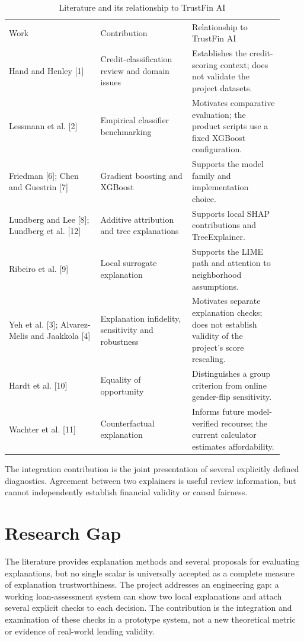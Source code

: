 \documentclass[12pt,a4paper]{report}
\begin{document}
\begin{longtable}{p{0.307\linewidth}p{0.307\linewidth}p{0.307\linewidth}}
\caption{Literature and its relationship to TrustFin AI}\\

Work & Contribution & Relationship to TrustFin AI\\
Hand and Henley [1] & Credit-classification review and domain issues & Establishes the credit-scoring context; does not validate the project datasets.\\
Lessmann et al. [2] & Empirical classifier benchmarking & Motivates comparative evaluation; the product scripts use a fixed XGBoost configuration.\\
Friedman [6]; Chen and Guestrin [7] & Gradient boosting and XGBoost & Supports the model family and implementation choice.\\
Lundberg and Lee [8]; Lundberg et al. [12] & Additive attribution and tree explanations & Supports local SHAP contributions and TreeExplainer.\\
Ribeiro et al. [9] & Local surrogate explanation & Supports the LIME path and attention to neighborhood assumptions.\\
Yeh et al. [3]; Alvarez-Melis and Jaakkola [4] & Explanation infidelity, sensitivity and robustness & Motivates separate explanation checks; does not establish validity of the project's score rescaling.\\
Hardt et al. [10] & Equality of opportunity & Distinguishes a group criterion from online gender-flip sensitivity.\\
Wachter et al. [11] & Counterfactual explanation & Informs future model-verified recourse; the current calculator estimates affordability.\\
\end{longtable}
The integration contribution is the joint presentation of several explicitly defined diagnostics. Agreement between two explainers is useful review information, but cannot independently establish financial validity or causal fairness.

\section{Research Gap}
The literature provides explanation methods and several proposals for evaluating explanations, but no single scalar is universally accepted as a complete measure of explanation trustworthiness. The project addresses an engineering gap: a working loan-assessment system can show two local explanations and attach several explicit checks to each decision. The contribution is the integration and examination of these checks in a prototype system, not a new theoretical metric or evidence of real-world lending validity.
\end{document}
